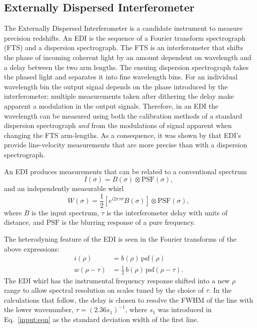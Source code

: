 \documentclass[preprint2, 10pt]{aastex}
\begin{document}
\subsection{Externally Dispersed Interferometer} 

The Externally Dispersed Interferometer \citep[EDI;][]{2003PASP..115..255E} is a candidate instrument to measure precision redshifts. 
An EDI is the sequence of a Fourier transform spectrograph (FTS) and a dispersion spectrograph.  The FTS is an interferometer that shifts
the phase of incoming coherent light
by an amount dependent on wavelength and a  delay between the two arm lengths.
The ensuing dispersion spectrograph takes the phased light and separates it into fine wavelength bins.
For an individual wavelength bin the output signal depends on the phase introduced by the interferometer; multiple
measurements taken after dithering the delay  make apparent a modulation in the output signals.
Therefore, in an EDI the wavelength can be measured using both the calibration methods of a standard dispersion
spectrograph {\it and\/} from the modulations of signal apparent when changing the FTS arm-lengths.   As a consequence,
it was shown by
\citet{2003PASP..115..255E} that EDI's provide line-velocity measurements that are more precise than with a dispersion spectrograph.

An EDI produces measurements that can be related
to a conventional spectrum
\begin{equation}
I(\sigma) = B(\sigma) \otimes \mbox{PSF}(\sigma),
\end{equation}
and an independently measurable whirl
\begin{equation}
W(\sigma) = \frac{1}{2}\left[e^{i2\pi\tau\sigma}B(\sigma)\right] \otimes \mbox{PSF}(\sigma),
\end{equation}
where $B$ is the input spectrum, $\tau$ is the interferometer delay
with units of distance, and $\mbox{PSF}$  is the blurring
response of a pure frequency.

The heterodyning feature of the EDI is seen in the Fourier transforms of the above expressions:
\begin{align}
i(\rho) & =b(\rho) \, \mbox{psf}(\rho)\\
w(\rho -\tau) & =\frac{1}{2}\, b(\rho) \, \mbox{psf}(\rho-\tau).
\end{align}
The EDI whirl has the instrumental frequency response shifted into a new $\rho$ range to allow
spectral
resolution on scales tuned by the choice of $\tau$.  In the calculations that follow, the delay is chosen to resolve
the FWHM of the line with the lower wavenumber, $\tau = (2.36s_1)^{-1}$, where $s_1$ was introduced
in Eq.~\ref{input:eqn} as the standard deviation width of the first line.
\end{document}
